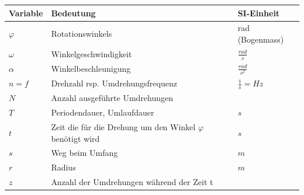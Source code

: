 \begin{tabbing}
	\begin{tabu} to \linewidth {l X l}
		Variable & Bedeutung & SI-Einheit \\
		\midrule
		$\varphi$ & Rotationswinkels  & rad (Bogenmass) \\ 
		$\omega$ & Winkelgeschwindigkeit & $\frac{rad}{s}$ \\
		$\alpha$ & Winkelbeschleunigung & $\frac{rad}{s^2}$ \\
		$n = f$ & Drehzahl rsp. Umdrehungsfrequenz & $\frac{1}{s} = Hz$ \\
		$N$ & Anzahl ausgeführte Umdrehungen & \\
		$T$ & Periodendauer, Umlaufdauer & $s$ \\
		$t$ & Zeit die für die Drehung um den Winkel $\varphi$ benötigt wird & $s$ \\
		$s$ & Weg beim Umfang & $m$ \\
		$r$ & Radius & $m$ \\
		$z$ & Anzahl der Umdrehungen während der Zeit t & \\
		\bottomrule
	\end{tabu}
\end{tabbing}

